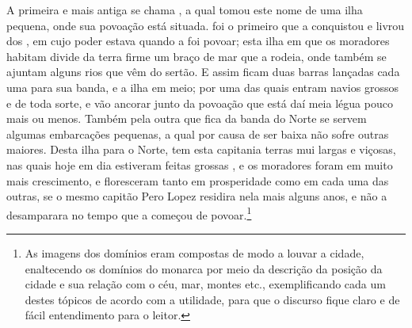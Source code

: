 A primeira e mais antiga se chama , a qual tomou este nome de uma			
ilha pequena, onde sua povoação está situada.  foi o
primeiro que a conquistou e livrou dos , em cujo poder estava
quando a foi povoar; esta ilha em que os moradores habitam divide da
terra firme um braço de mar que a rodeia, onde também se ajuntam alguns
rios que vêm do sertão. E assim ficam duas barras lançadas cada uma para
sua banda, e a ilha em meio; por uma das quais entram navios grossos e
de toda sorte, e vão ancorar junto da povoação que está daí meia légua
pouco mais ou menos. Também pela outra que fica da banda do Norte se
servem algumas embarcações pequenas, a qual por causa de ser baixa não
sofre outras maiores. Desta ilha para o Norte, tem esta capitania
terras mui largas e viçosas, nas quais hoje em dia estiveram feitas
grossas , e os moradores foram em muito mais crescimento, e
floresceram tanto em prosperidade como em cada uma das outras, se o mesmo
capitão Pero Lopez residira nela mais alguns anos, e não a desamparara				
no tempo que a começou de povoar.\footnote{ As imagens dos domínios eram
compostas de modo a louvar a cidade, enaltecendo os domínios do monarca
por meio da descrição da posição da cidade e sua relação com o céu,
mar, montes etc., exemplificando cada um destes tópicos de acordo com a
utilidade, para que o discurso fique claro e de fácil entendimento para o leitor.}

